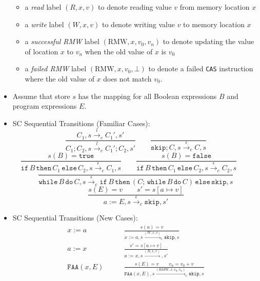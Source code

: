 \documentclass[twocolumn,landscape,10pt]{article}
\theoremstyle{definition}
\begin{document}
\begin{itemize}
\begin{itemize}
            \item a \emph{read} label $(R,x,v)$ to denote reading value $v$ from
                memory location $x$
            \item a \emph{write} label $(W,x,v)$ to denote writing value $v$ to
                memory location $x$
            \item a \emph{successful RMW} label $(\text{RMW},x,v_0,v_n)$ to
                denote updating the value of location $x$ to $v_n$ when the old
                value of $x$ is $v_0$
            \item a \emph{failed RMW} label $(\text{RMW},x,v_0,\bot)$ to denote
                a failed \texttt{CAS} instruction where the old value of $x$
                does not match $v_0$.
        \end{itemize} 
    \item Assume that store $s$ has the mapping for all Boolean expressions $B$
        and program expressions $E$.
    \item SC Sequential Transitions (Familiar Cases):
        \[
            \frac{C_1,s\xrightarrow{l}_c C_1',s'}{C_1;C_2,s\xrightarrow{l}_c
            C_1';C_2,s'} \qquad
            \frac{}{\texttt{skip};C,s\xrightarrow{\epsilon}_c C,s}
        \]
        \[
            \frac{s(B)=\texttt{true}}{\texttt{if}\,B\,\texttt{then}\,C_1\,\texttt{else}\,C_2,s\xrightarrow{\epsilon}_c
            C_1,s} \qquad
            \frac{s(B)=\texttt{false}}{\texttt{if}\,B\,\texttt{then}\,C_1\,\texttt{else}\,C_2,s\xrightarrow{\epsilon}_c
            C_2,s} \qquad
        \]
        \[
            \frac{}{\texttt{while}\,B\,\texttt{do}\,C,s\xrightarrow{\epsilon}_c
            \texttt{if}\,B\,\texttt{then}\,(C;\,\texttt{while}\,B\,\texttt{do}\,C)\,
            \texttt{else}\,\texttt{skip}, s}
        \]
        \[
            \frac{s(E)=v\qquad s'=s[a\mapsto
            v]}{a:=E,s\xrightarrow{\epsilon}_c\texttt{skip},s'}
        \]
    \item SC Sequential Transitions (New Cases):
        \begin{align*}
            x:=a\qquad& \frac{s(a)=v}
            {x:=a,s\xrightarrow{(W,x,v)}_c\texttt{skip},s} \\[0.5em]
            a:=x\qquad& \frac{s'=s[a\mapsto v]}
            {a:=x,s\xrightarrow{(R,x,v)},s'} \\[0.5em]
            \texttt{FAA}(x,E)\qquad& \frac{s(E)=v\qquad v_n=v_0+v}
            {\texttt{FAA}(x,E),s\xrightarrow{(\text{RMW},x,v_0,v_n)}_c\texttt{skip},s}\\[0.5em]

\end{align*}
\end{itemize}
\end{document}
